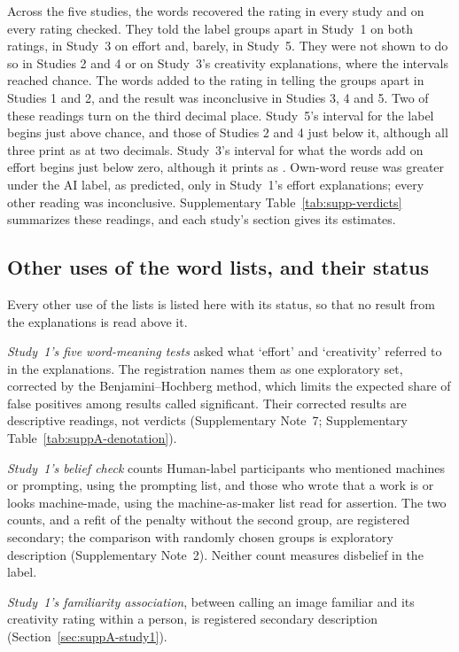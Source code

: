 Across the five studies, the words recovered the rating in every study and on every rating checked. They told the label groups apart in Study~1 on both ratings, in Study~3 on effort and, barely, in Study~5. They were not shown to do so in Studies 2 and 4 or on Study~3's creativity explanations, where the intervals reached chance. The words added to the rating in telling the groups apart in Studies 1 and 2, and the result was inconclusive in Studies 3, 4 and 5. Two of these readings turn on the third decimal place. Study~5's interval for the label begins just above chance, and those of Studies 2 and 4 just below it, although all three print as \STwoTextRecArmCreatLo{} at two decimals. Study~3's interval for what the words add on effort begins just below zero, although it prints as \SThreeTextRecIncrEffLo. Own-word reuse was greater under the AI label, as predicted, only in Study~1's effort explanations; every other reading was inconclusive. Supplementary Table~\ref{tab:supp-verdicts} summarizes these readings, and each study's section gives its estimates.

\subsection*{Other uses of the word lists, and their status}

Every other use of the lists is listed here with its status, so that no result from the explanations is read above it.

\emph{Study~1's five word-meaning tests} asked what `effort' and `creativity' referred to in the explanations. The registration names them as one exploratory set, corrected by the Benjamini--Hochberg method, which limits the expected share of false positives among results called significant.\cite{benjamini1995controlling} Their corrected results are descriptive readings, not verdicts (Supplementary Note~7; Supplementary Table~\ref{tab:suppA-denotation}).

\emph{Study~1's belief check} counts Human-label participants who mentioned machines or prompting, using the prompting list, and those who wrote that a work is or looks machine-made, using the machine-as-maker list read for assertion. The two counts, and a refit of the penalty without the second group, are registered secondary; the comparison with randomly chosen groups is exploratory description (Supplementary Note~2). Neither count measures disbelief in the label.

\emph{Study~1's familiarity association}, between calling an image familiar and its creativity rating within a person, is registered secondary description (Section~\ref{sec:suppA-study1}).

